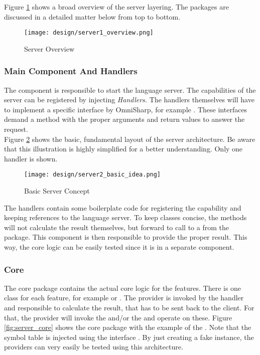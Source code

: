Figure \ref{fig:server_overview} shows a broad overview of the server layering.
The packages are discussed in a detailed matter below from top to bottom.

\begin{figure}[H]
    \centering
    \texttt{[image: design/server1\_overview.png]}
    \caption{Server Overview}
    \label{fig:server_overview}
\end{figure}

\subsubsection{Main Component And Handlers}
The  component is responsible to start the language server.
The capabilities of the server can be registered by injecting \textit{Handlers.}
The handlers themselves will have to implement a specific interface by OmniSharp, for example .
These interfaces demand a  method with the proper arguments and return values to answer the request.\\

Figure \ref{fig:server_basic_idea} shows the basic, fundamental layout of the server architecture.
Be aware that this illustration is highly simplified for a better understanding.
Only one handler is shown.\\

\begin{figure}[H]
    \centering
    \texttt{[image: design/server2\_basic\_idea.png]}
    \caption{Basic Server Concept}
    \label{fig:server_basic_idea}
\end{figure}

The handlers contain some boilerplate code for registering the capability and keeping references to the language server.
To keep classes concise, the  methods will not calculate the result themselves, but forward to call to a  from the  package.
This component is then responsible to provide the proper result.
This way, the core logic can be easily tested since it is in a separate component.\\

\subsubsection {Core}
The core package contains the actual core logic for the features.
There is one class for each feature, for example  or .
The provider is invoked by the handler and responsible to calculate the result, that has to be sent back to the client.
For that, the provider will invoke the  and/or the  and operate on these.
Figure \ref{fig:server_core} shows the core package with the example of the .
Note that the symbol table is injected using the interface .
By just creating a fake instance, the providers can very easily be tested using this architecture.

